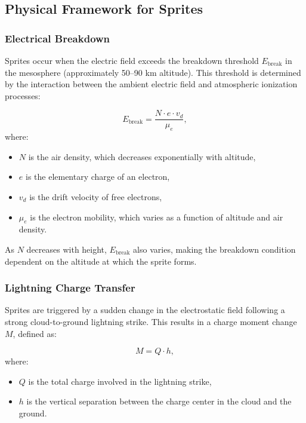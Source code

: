 \documentclass[a4paper,10pt]{article}
\begin{document}
\subsection*{Physical Framework for Sprites}


\subsubsection*{Electrical Breakdown}
Sprites occur when the electric field exceeds the breakdown threshold $E_\text{break}$ in the mesosphere (approximately 50–90 km altitude). This threshold is determined by the interaction between the ambient electric field and atmospheric ionization processes:


\begin{equation*}
E_\text{break} = \frac{N \cdot e \cdot v_d}{\mu_e},
\end{equation*}
where:
\begin{itemize}
\item $N$ is the air density, which decreases exponentially with altitude,
\item $e$ is the elementary charge of an electron,
\item $v_d$ is the drift velocity of free electrons,
\item $\mu_e$ is the electron mobility, which varies as a function of altitude and air density.
\end{itemize}


As $N$ decreases with height, $E_\text{break}$ also varies, making the breakdown condition dependent on the altitude at which the sprite forms.


\subsubsection*{Lightning Charge Transfer}
Sprites are triggered by a sudden change in the electrostatic field following a strong cloud-to-ground lightning strike. This results in a charge moment change $M$, defined as:


\begin{equation*}
M = Q \cdot h,
\end{equation*}
where:
\begin{itemize}
\item $Q$ is the total charge involved in the lightning strike,
\item $h$ is the vertical separation between the charge center in the cloud and the ground.
\end{itemize}
\end{document}
